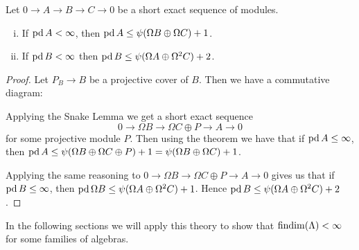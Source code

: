 \begin{cor}\label{cor:projdim_bounded_by_psi}
	Let $0 \to A \to B \to C \to 0$ be a short exact sequence of modules. 
	\begin{enumerate}[i)]
		\item \label{cor:projdim_bounded_by_psi_i}
		If $\operatorname{pd} A < \infty$, then $\operatorname{pd} A \leq \psi(\Omega B \oplus \Omega C)+1$.
		\item \label{cor:projdim_bounded_by_psi_ii}
		If $\operatorname{pd} B < \infty$ then $\operatorname{pd} B \leq \psi(\Omega A \oplus \Omega^2 C) + 2$.
	\end{enumerate}
	\begin{proof}
		Let $P_B \to B$ be a projective cover of $B$. Then we have a commutative diagram:
		\begin{center}
		\end{center}
		Applying the Snake Lemma we get a short exact sequence $$0 \to \Omega B \to \Omega C \oplus P \to A \to 0$$ for some projective module $P$. Then using the theorem we have that if $\operatorname{pd} A \leq \infty$, then $\operatorname{pd} A \leq \psi(\Omega B \oplus \Omega C \oplus P) + 1 = \psi(\Omega B \oplus \Omega C) + 1$.
		
		Applying the same reasoning to $0 \to \Omega B \to \Omega C \oplus P \to A \to 0$ gives us that if $\operatorname{pd} B \leq \infty$, then $\operatorname{pd}\Omega B \leq \psi(\Omega A \oplus \Omega^2 C) + 1$. Hence $\operatorname{pd} B \leq  \psi(\Omega A \oplus \Omega^2 C) + 2$.
	\end{proof}
\end{cor}

In the following sections we will apply this theory to show that $\operatorname{findim}(\Lambda) < \infty$ for some families of algebras.

